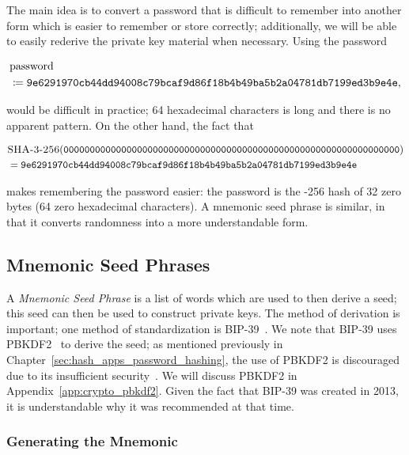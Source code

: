The main idea is to convert a password that is difficult to remember
into another form which is easier to remember
or store correctly;
additionally, we will be able to easily rederive the private key material
when necessary.
Using the password

\begin{align}
    &\text{password} \nonumber\\
    &\coloneqq{}
    \texttt{9e6291970cb44dd94008c79bcaf9d86f18b4b49ba5b2a04781db7199ed3b9e4e},
\end{align}

\noindent
would be difficult in practice;
64 hexadecimal characters is long and there is no apparent pattern.
On the other hand, the fact that

\begin{align}
    &\textsc{\ShaThree{}-256}(
    \texttt{0000000000000000000000000000000000000000000000000000000000000000})
    \nonumber\\
    &= 
    \texttt{9e6291970cb44dd94008c79bcaf9d86f18b4b49ba5b2a04781db7199ed3b9e4e}
\end{align}

\noindent
makes remembering the password easier:
the password is the \textsc{\ShaThree{}-256} hash of 32 zero bytes
(64 zero hexadecimal characters).
A mnemonic seed phrase is similar, in that it converts
randomness into a more understandable form.

\subsection{Mnemonic Seed Phrases}

A \emph{Mnemonic Seed Phrase} is a list of words which are used to then
derive a seed;
this seed can then be used to construct private keys.
The method of derivation is important;
one method of standardization is BIP-39~\cite{BIP-39}.
We note that BIP-39 uses PBKDF2~\cite{rfc8018} to derive the seed;
as mentioned previously in Chapter~\ref{sec:hash_apps_password_hashing},
the use of PBKDF2 is discouraged due to its insufficient
security~\cite{blocki2018economics}.
We will discuss PBKDF2 in Appendix~\ref{app:crypto_pbkdf2}.
Given the fact that BIP-39 was created in 2013, it is understandable
why it was recommended at that time.

\subsubsection{Generating the Mnemonic}

